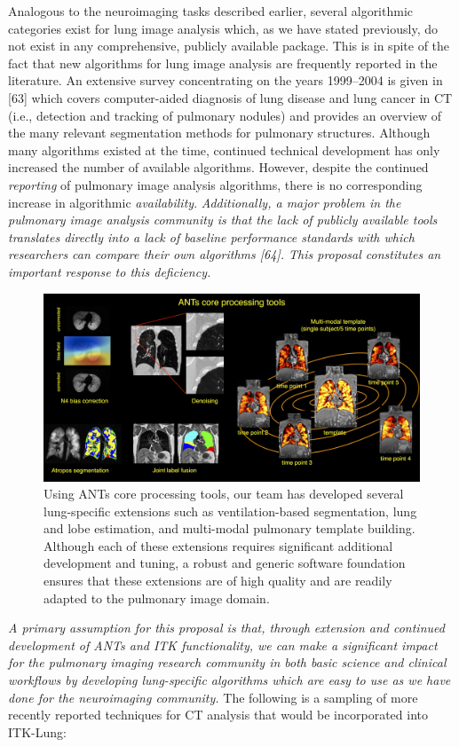 \documentclass[11pt,]{article}
\begin{document}
Analogous to the neuroimaging tasks described earlier, several
algorithmic categories exist for lung image analysis which, as we have
stated previously, do not exist in any comprehensive, publicly available
package. This is in spite of the fact that new algorithms for lung image
analysis are frequently reported in the literature. An extensive survey
concentrating on the years 1999--2004 is given in {[}63{]} which covers
computer-aided diagnosis of lung disease and lung cancer in CT (i.e.,
detection and tracking of pulmonary nodules) and provides an overview of
the many relevant segmentation methods for pulmonary structures.
Although many algorithms existed at the time, continued technical
development has only increased the number of available algorithms.
However, despite the continued \emph{reporting} of pulmonary image
analysis algorithms, there is no corresponding increase in algorithmic
\emph{availability}. \emph{Additionally, a major problem in the
pulmonary image analysis community is that the lack of publicly
available tools translates directly into a lack of baseline performance
standards with which researchers can compare their own algorithms
{[}64{]}. This proposal constitutes an important response to this
deficiency.}

\begin{figure}[htbp]
\centering
\includegraphics{Figs/coreANtsToolsLung.png}
\caption{Using ANTs core processing tools, our team has developed
several lung-specific extensions such as ventilation-based segmentation,
lung and lobe estimation, and multi-modal pulmonary template building.
Although each of these extensions requires significant additional
development and tuning, a robust and generic software foundation ensures
that these extensions are of high quality and are readily adapted to the
pulmonary image domain.}
\end{figure}

\emph{A primary assumption for this proposal is that, through extension
and continued development of ANTs and ITK functionality, we can make a
significant impact for the pulmonary imaging research community in both
basic science and clinical workflows by developing lung-specific
algorithms which are easy to use as we have done for the neuroimaging
community.} The following is a sampling of more recently reported
techniques for CT analysis that would be incorporated into ITK-Lung:
\end{document}
